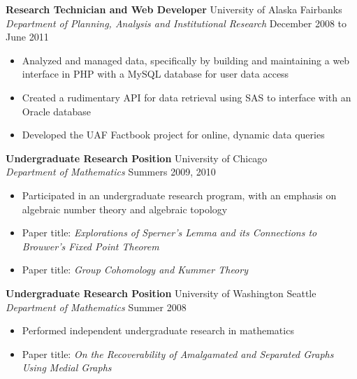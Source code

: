 \documentclass{article}
\begin{document}
\begin{flushleft}
\hspace{20pt}
\textbf{Research Technician and Web Developer} \hfill University of Alaska Fairbanks\\
\hspace{20pt}
\textit{Department of Planning, Analysis and Institutional Research} \hfill December 2008 to June 2011\\
\begin{itemize}[leftmargin=50pt,itemsep=-2pt]
\item Analyzed and managed data, specifically by building and maintaining a web interface in PHP with a MySQL database for user data access
\item Created a rudimentary API for data retrieval using SAS to interface with an Oracle database
\item Developed the UAF Factbook project for online, dynamic data queries
\end{itemize}
 
\hspace{20pt}
\textbf{Undergraduate Research Position} \hfill University of Chicago\\
\hspace{20pt}
\textit{Department of Mathematics} \hfill Summers 2009, 2010\\
\begin{itemize}[leftmargin=50pt,itemsep=-2pt]
\item Participated in an undergraduate research program, with an emphasis on algebraic number theory and algebraic topology
\item Paper title: \textit{Explorations of Sperner's Lemma and its Connections to Brouwer's Fixed Point Theorem}
\item Paper title: \textit{Group Cohomology and Kummer Theory}
\end{itemize}

\hspace{20pt}
\textbf{Undergraduate Research Position} \hfill University of Washington Seattle\\
\hspace{20pt}
\textit{Department of Mathematics} \hfill Summer 2008\\
\begin{itemize}[leftmargin=50pt,itemsep=-2pt]
\item Performed independent undergraduate research in mathematics
\item Paper title: \textit{On the Recoverability of Amalgamated and Separated Graphs Using Medial Graphs}
\end{itemize}


\end{flushleft}
\end{document}
